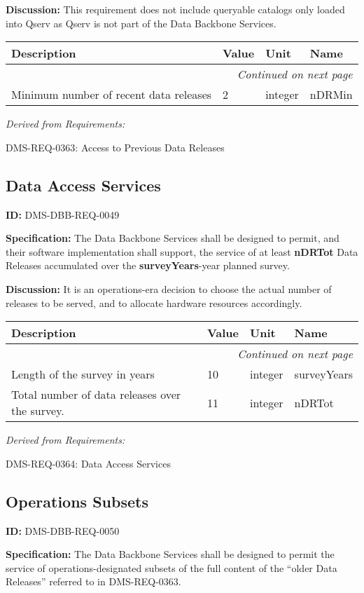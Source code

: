 \documentclass[SE,toc]{lsstdoc}
\makeatletter
\newcommand{\paramname}[1]{\hspace{0pt}#1}
\newcommand{\unitname}[1]{\hspace{0pt}#1}
\newenvironment{parameters}[0]{%
\setlength\LTleft{0pt}
\setlength\LTright{\fill}
\begin{small}
\begin{longtable}[]{|p{0.49\textwidth}|l|p{0.6in}|p{1.70in}@{}|}

\hline \textbf{Description} & \textbf{Value} & \textbf{Unit} & \textbf{Name} \\ \hline
\endhead

\hline \multicolumn{4}{r}{\emph{Continued on next page}} \\
\endfoot

\hline\hline
\endlastfoot
}{%
\hline
\end{longtable}
\end{small}
}
\makeatother
\begin{document}
\textbf{Discussion:}
This requirement does not include queryable catalogs only loaded into Qserv as Qserv is not part of the Data Backbone Services.

\begin{parameters}
Minimum number of recent data releases
&
2
&
\unitname{%
integer
}
&
\paramname{%
nDRMin
} \\\hline
\end{parameters}

\emph{Derived from Requirements:}

DMS-REQ-0363:
Access to Previous Data Releases \newline

\subsection{Data Access Services}

\label{DMS-DBB-REQ-0049}
\textbf{ID:} DMS-DBB-REQ-0049

\textbf{Specification:}
The Data Backbone Services shall be designed to permit, and their software implementation shall support, the service of at least \textbf{nDRTot} Data Releases accumulated over the \textbf{surveyYears}-year planned survey.

\textbf{Discussion:}
It is an operations-era decision to choose the actual number of releases to be served, and to allocate hardware resources accordingly.

\begin{parameters}
Length of the survey in years
&
10
&
\unitname{%
integer
}
&
\paramname{%
surveyYears
} \\\hline
Total number of data releases over the survey.
&
11
&
\unitname{%
integer
}
&
\paramname{%
nDRTot
} \\\hline
\end{parameters}

\emph{Derived from Requirements:}

DMS-REQ-0364:
Data Access Services \newline

\subsection{Operations Subsets}

\label{DMS-DBB-REQ-0050}
\textbf{ID:} DMS-DBB-REQ-0050

\textbf{Specification:}
The Data Backbone Services shall be designed to permit the service of operations-designated subsets of the full content of the “older Data Releases” referred to in DMS-REQ-0363.
\end{document}
